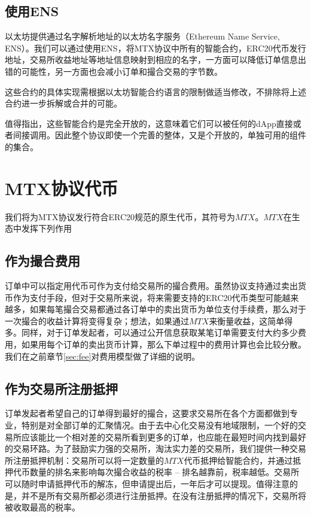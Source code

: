 \documentclass[UTF8,nofonts]{ctexart}
\begin{document}
\subsection{使用ENS\label{sec:registration}}

以太坊提供通过名字解析地址的以太坊名字服务（Ethereum Name Service, ENS）\cite{hirai2016formal}。我们可以通过使用ENS，将MTX协议中所有的智能合约，ERC20代币发行地址，交易所收益地址等地址信息映射到相应的名字，一方面可以降低订单信息出错的可能性，另一方面也会减小订单和撮合交易的字节数。


这些合约的具体实现需根据以太坊智能合约语言的限制做适当修改，不排除将上述合约进一步拆解或合并的可能。

值得指出，这些智能合约是完全开放的，这意味着它们可以被任何的dApp直接或者间接调用。因此整个协议即使一个完善的整体，又是个开放的，单独可用的组件的集合。

\section{MTX协议代币\label{sec:protocoltoken}}

我们将为MTX协议发行符合ERC20规范的原生代币，其符号为$MTX$。$MTX$在生态中发挥下列作用

\subsection{作为撮合费用}
订单中可以指定用代币可作为支付给交易所的撮合费用。虽然协议支持通过卖出货币作为支付手段，但对于交易所来说，将来需要支持的ERC20代币类型可能越来越多，如果每笔撮合交易都通过各订单中的卖出货币为单位支付手续费，那么对于一次撮合的收益计算将变得复杂；想法，如果通过$MTX$来衡量收益，这简单得多。同样，对于订单发起者，可以通过公开信息获取某笔订单需要支付大约多少费用，如果用每个订单的卖出货币计算，那么下单过程中的费用计算也会比较分散。我们在之前章节\ref{sec:fee}对费用模型做了详细的说明。


\subsection{作为交易所注册抵押\label{sec:exchangedeposit}}

订单发起者希望自己的订单得到最好的撮合，这要求交易所在各个方面都做到专业，特别是对全部订单的汇聚情况。由于去中心化交易没有地域限制，一个好的交易所应该能比一个相对差的交易所看到更多的订单，也应能在最短时间内找到最好的交易环路。为了鼓励实力强的交易所，淘汰实力差的交易所，我们提供一种交易所注册抵押机制：交易所可以将一定数量的$MTX$代币抵押给智能合约，并通过抵押代币数量的排名来影响每次撮合收益的税率 -- 排名越靠前，税率越低。交易所可以随时申请抵押代币的解冻，但申请提出后，一年后才可以提现。值得注意的是，并不是所有交易所都必须进行注册抵押。在没有注册抵押的情况下，交易所将被收取最高的税率。
\end{document}

